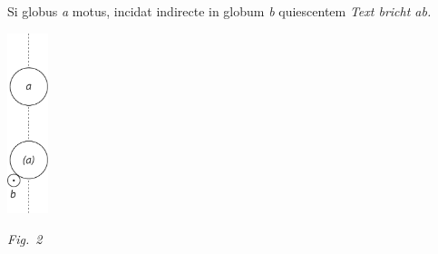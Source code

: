 %
\pend
%
\pstart
Si globus \textit{a} motus, incidat indirecte in globum \textit{b}%
%
quiescentem
\lbrack\textit{Text bricht ab.}\rbrack
\pend
%
\vspace{2.0em}
\centerline{\includegraphics[width=0.09\textwidth]{gesamttex/edit_VIII,3/images/LH_35_10_16_007_d2_007r.pdf}}
\vspace{0.5em}
\centerline{\lbrack\textit{Fig.~2}\rbrack}
\count{}%
\count{}%
\count{}
%
%
%
